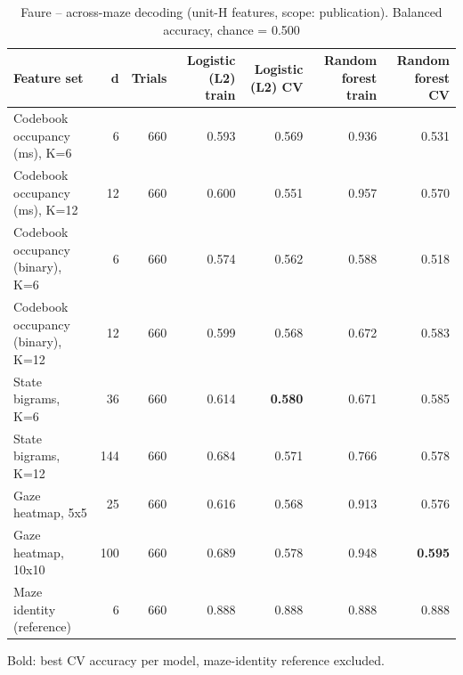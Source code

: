 \begin{table}[t]
\centering
\caption{Faure -- across-maze decoding (unit-H features, scope: publication). Balanced accuracy, chance = 0.500}
\label{tab:crossmaze_Faure}
\begin{tabular}{lrrrrrr}
\toprule
Feature set & d & Trials & Logistic (L2) train & Logistic (L2) CV & Random forest train & Random forest CV \\
\midrule
Codebook occupancy (ms), K=6 & 6 & 660 & 0.593 & 0.569 & 0.936 & 0.531 \\
Codebook occupancy (ms), K=12 & 12 & 660 & 0.600 & 0.551 & 0.957 & 0.570 \\
Codebook occupancy (binary), K=6 & 6 & 660 & 0.574 & 0.562 & 0.588 & 0.518 \\
Codebook occupancy (binary), K=12 & 12 & 660 & 0.599 & 0.568 & 0.672 & 0.583 \\
State bigrams, K=6 & 36 & 660 & 0.614 & \textbf{0.580} & 0.671 & 0.585 \\
State bigrams, K=12 & 144 & 660 & 0.684 & 0.571 & 0.766 & 0.578 \\
Gaze heatmap, 5x5 & 25 & 660 & 0.616 & 0.568 & 0.913 & 0.576 \\
Gaze heatmap, 10x10 & 100 & 660 & 0.689 & 0.578 & 0.948 & \textbf{0.595} \\
Maze identity (reference) & 6 & 660 & 0.888 & 0.888 & 0.888 & 0.888 \\
\bottomrule
\end{tabular}
\par\smallskip
{\footnotesize Bold: best CV accuracy per model, maze-identity reference excluded.}
\end{table}
